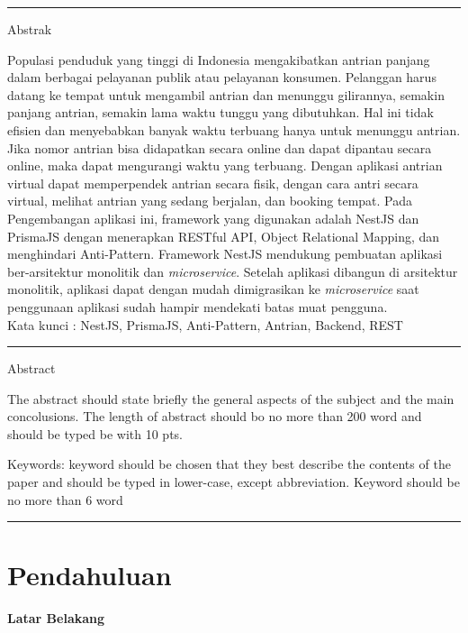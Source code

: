 {\bf \parindent0pt \noindent\rule{\textwidth}{1pt}
Abstrak

Populasi penduduk yang tinggi di Indonesia mengakibatkan antrian panjang dalam berbagai pelayanan publik atau pelayanan konsumen. Pelanggan harus datang ke tempat untuk mengambil antrian dan menunggu gilirannya, semakin panjang antrian, semakin lama waktu tunggu yang dibutuhkan. Hal ini tidak efisien dan menyebabkan banyak waktu terbuang hanya untuk menunggu antrian. Jika nomor antrian bisa didapatkan secara online dan dapat dipantau secara online, maka dapat mengurangi waktu yang terbuang. Dengan aplikasi antrian virtual dapat memperpendek antrian secara fisik, dengan cara antri secara virtual, melihat antrian yang sedang berjalan, dan booking tempat. Pada Pengembangan aplikasi ini, framework yang digunakan adalah NestJS dan PrismaJS dengan menerapkan RESTful API, Object Relational Mapping, dan menghindari Anti-Pattern. Framework NestJS mendukung pembuatan aplikasi ber-arsitektur monolitik dan \textit{microservice}. Setelah aplikasi dibangun di arsitektur monolitik, aplikasi dapat dengan mudah dimigrasikan ke \textit{microservice} saat penggunaan aplikasi sudah hampir mendekati batas muat pengguna.\\

 \bigskip
Kata kunci : NestJS, PrismaJS, Anti-Pattern, Antrian, Backend, REST






\noindent\rule{\textwidth}{1pt}
Abstract

The abstract should state briefly the general aspects of the subject and the main concolusions.  The length of abstract should bo no more than 200 word and  should be typed be with 10 pts.

 \bigskip
Keywords: keyword should be chosen that they best describe the contents of the paper and should be typed in lower-case, except abbreviation. Keyword should be no more than 6 word 

\noindent\rule{\textwidth}{1pt} }
   



\section{Pendahuluan}

\noindent\textbf{Latar Belakang}

